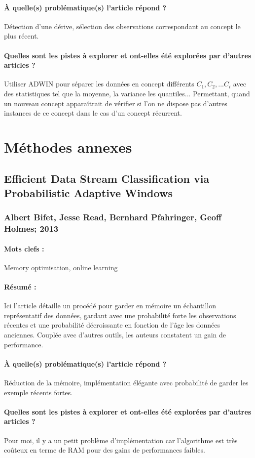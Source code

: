 \documentclass[11pt,a4paper]{report}
\begin{document}
\paragraph{À quelle(s) problématique(s) l'article répond ?} Détection d'une dérive, sélection des observations correspondant au concept le plus récent.

\paragraph{Quelles sont les pistes à explorer et ont-elles  été explorées par d'autres articles ?} Utiliser ADWIN pour séparer les données en concept différents $C_1, C_2, ... C_i$ avec des statistiques tel que la moyenne, la variance les quantiles... Permettant, quand un nouveau concept apparaîtrait de vérifier si l'on ne dispose pas d'autres instances de ce concept dans le cas d'un concept récurrent.



\section{Méthodes annexes}

\subsection{Efficient Data Stream Classification via Probabilistic Adaptive Windows}
\subsubsection{Albert Bifet, Jesse Read, Bernhard Pfahringer, Geoff Holmes; 2013}

\paragraph{Mots clefs :}Memory optimisation, online learning 

\paragraph{Résumé :} Ici l'article détaille un procédé pour garder en mémoire un échantillon représentatif des données, gardant avec une probabilité forte les observations récentes et une probabilité décroissante en fonction de l'âge les données anciennes. Couplée avec d'autres outils, les auteurs constatent un gain de performance.

\paragraph{À quelle(s) problématique(s) l'article répond ?} Réduction de la mémoire, implémentation élégante avec probabilité de garder les exemple récents fortes.

\paragraph{Quelles sont les pistes à explorer et ont-elles  été explorées par d'autres articles ?} Pour moi, il y a un petit problème d'implémentation car l'algorithme est très coûteux en terme de RAM pour des gains de performances faibles.




\newpage
\end{document}
